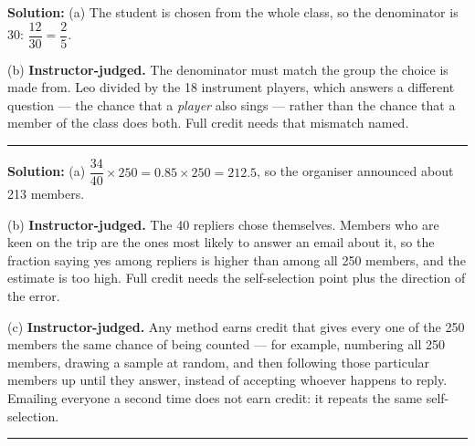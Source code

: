 \documentclass[12pt]{article}
\begin{document}
\textbf{Solution:} (a) The student is chosen from the whole class, so the
denominator is 30: $\dfrac{12}{30} = \dfrac{2}{5}$. 

(b) \textbf{Instructor-judged.} The denominator must match the group the choice
is made from. Leo divided by the 18 instrument players, which answers a
different question --- the chance that a \emph{player} also sings --- rather
than the chance that a member of the class does both. Full credit needs that
mismatch named.

\vspace{0.25cm}\noindent\rule{\linewidth}{0.2pt}\vspace{0.25cm}


\textbf{Solution:} (a) $\dfrac{34}{40} \times 250 = 0.85 \times 250 = 212.5$, so
the organiser announced about 213 members. 

(b) \textbf{Instructor-judged.} The 40 repliers chose themselves. Members who
are keen on the trip are the ones most likely to answer an email about it, so
the fraction saying yes among repliers is higher than among all 250 members, and
the estimate is too high. Full credit needs the self-selection point plus the
direction of the error.

(c) \textbf{Instructor-judged.} Any method earns credit that gives every one of
the 250 members the same chance of being counted --- for example, numbering all
250 members, drawing a sample at random, and then following those particular
members up until they answer, instead of accepting whoever happens to reply.
Emailing everyone a second time does not earn credit: it repeats the same
self-selection.

\vspace{0.25cm}\noindent\rule{\linewidth}{0.2pt}\vspace{0.25cm}
\end{document}
